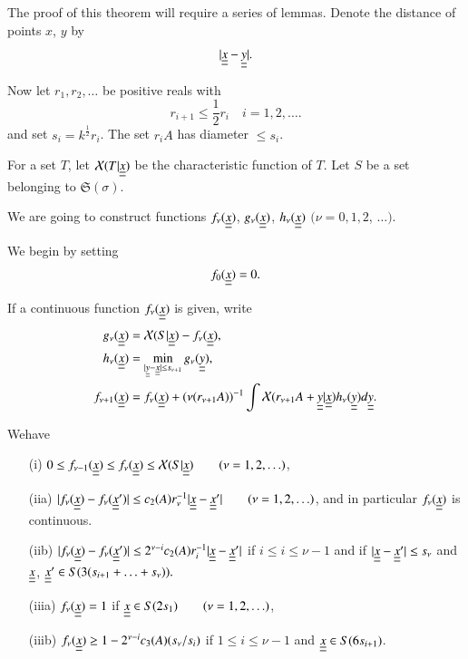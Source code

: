 The proof of this theorem will require a series of lemmas. Denote the distance of points $x$, $y$ by
$$
|\underline{\underline{x}} - \underline{\underline{y}}|.
$$

Now let $r_{1}, r_{2}, \ldots$ be positive reals with
\begin{equation*}
r_{i+1} \leq \frac{1}{2} r_{i} \quad{i = 1, 2, \ldots}.\tag{15.1}\label{chap2:sec15:eq15.1}
\end{equation*}
and set $s_{i} = k^{\frac{1}{2}} r_{i}$. The set $r_{i} A$ has diameter $\leq s_{i}$.

For a set $T$, let $\mathcal{X} (T | \underline{\underline{x}})$ be the characteristic function of $T$. Let $S$ be a set belonging to $\mathfrak{S}(\sigma)$.

We are going to construct functions $f_{\nu} (\underline{\underline{x}})$, $g_{\nu} (\underline{\underline{x}})$, $h_{\nu} (\underline{\underline{x}})$ $(\nu = 0, 1, 2$, $\ldots)$.

We begin by setting
$$
f_{0}(\underline{\underline{x}}) = 0.
$$

If a continuous function $f_{\nu} (\underline{\underline{x}})$ is given, write
\begin{align*}
g_{\nu} (\underline{\underline{x}}) & = \mathcal{X}(S | \underline{\underline{x}}) - f_{\nu} (\underline{\underline{x}}),\\
h_{\nu} (\underline{\underline{x}}) & = \min_{|\underline{\underline{y}} - \underline{\underline{x}}| \leq s_{\nu+1}} g_{\nu} (\underline{\underline{y}}),\\
f_{\nu+1} (\underline{\underline{x}}) &= f_{\nu} (\underline{\underline{x}}) + (\nu(r_{\nu+1} A))^{-1} \int \mathcal{X} (r_{\nu+1} A + \underline{\underline{y}} | \underline{\underline{x}}) h_{\nu} (\underline{\underline{y}}) d\underline{\underline{y}}.
\end{align*}

\begin{lemma}\label{chap2:sec15:lem15B}
We\pageoriginale have
\begin{enumerate}
\item[\rm(i)] $0 \leq f_{\nu-1} (\underline{\underline{x}}) \leq f_{\nu} (\underline{\underline{x}}) \leq \mathcal{X} (S | \underline{\underline{x}}) \qquad (\nu = 1, 2, \ldots)$,
\item[\rm(iia)] $|f_{\nu}(\underline{\underline{x}}) - f_{\nu}(\underline{\underline{x}}')| \leq c_{2} (A) r_{\nu}^{-1} |\underline{\underline{x}} - \underline{\underline{x}}'| \qquad (\nu = 1, 2, \ldots)$,
 and in particular $f_{\nu}(\underline{\underline{x}})$ is continuous.
\item[\rm(iib)] $|f_{\nu} (\underline{\underline{x}}) - f_{\nu}(\underline{\underline{x}}')| \leq 2^{\nu - i} c_{2} (A) r_{i}^{-1} |\underline{\underline{x}} - \underline{\underline{x}}'|$
if $i \leq i \leq \nu - 1$ and if $|\underline{\underline{x}} - \underline{\underline{x}}'| \leq s_{\nu}$ and $\underline{\underline{x}}$, $\underline{\underline{x}}' \in S(3(s_{i+1} + \ldots + s_{\nu})).$
\item[\rm(iiia)] $f_{\nu} (\underline{\underline{x}}) = 1$ if $\underline{\underline{x}} \in S(2s_{1}) \qquad (\nu = 1, 2, \ldots)$,
\item[\rm(iiib)] $f_{\nu} (\underline{\underline{x}}) \geq 1 - 2^{\nu-i} c_{3} (A) (s_{\nu}/s_{i})$ if $1 \leq i \leq \nu - 1$ and $\underline{\underline{x}} \in S(6s_{i+1})$.
\end{enumerate}
\end{lemma}

